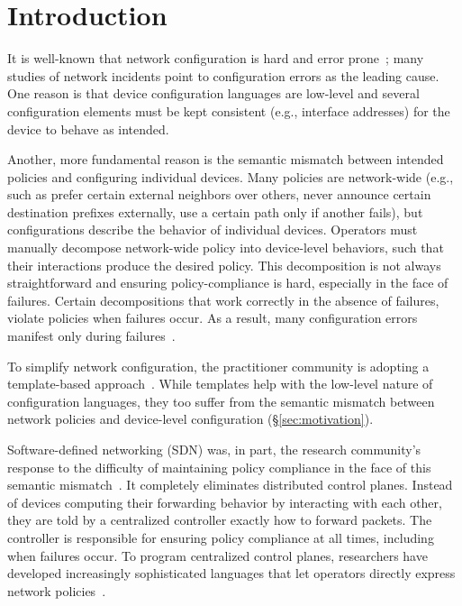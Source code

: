 \section{Introduction}
\label{sec:introduction}

It is well-known that network configuration is hard and error prone~\cite{x,y,z}; many studies of network incidents point to configuration errors as the leading cause.
%
One reason is that device configuration languages are low-level and several configuration elements must be kept consistent (e.g., interface addresses) for the device to behave as intended.
%

Another, more fundamental reason is the semantic mismatch between intended policies and configuring individual devices.
%
Many policies are network-wide (e.g., such as prefer certain external neighbors over others, never announce certain destination prefixes externally, use a certain path only if another fails), but configurations describe the behavior of individual devices.
%
Operators must manually decompose network-wide policy into device-level behaviors, such that their interactions produce the desired policy.
%
This decomposition is not always straightforward and ensuring policy-compliance is hard, especially in the face of failures. Certain decompositions that work correctly in the absence of failures, violate policies when failures occur.
%
As a result, many configuration errors manifest only during failures~\cite{batfish}.

To simplify network configuration, the practitioner community is adopting a template-based approach~\cite{x,y}. While templates help with the low-level nature of configuration languages, they too suffer from the semantic mismatch between network policies and device-level configuration (\S\ref{sec:motivation}).

Software-defined networking (SDN) was, in part, the research community's response to the difficulty of maintaining policy compliance in the face of this semantic mismatch~\cite{xx}. It completely eliminates distributed control planes. Instead of devices computing their forwarding behavior by interacting with each other, they are told by a centralized controller exactly how to forward packets. The controller is responsible for ensuring policy compliance at all times, including when failures occur. To program centralized control planes, researchers have developed increasingly sophisticated languages that let operators directly express network policies~\cite{x,y,z}.

